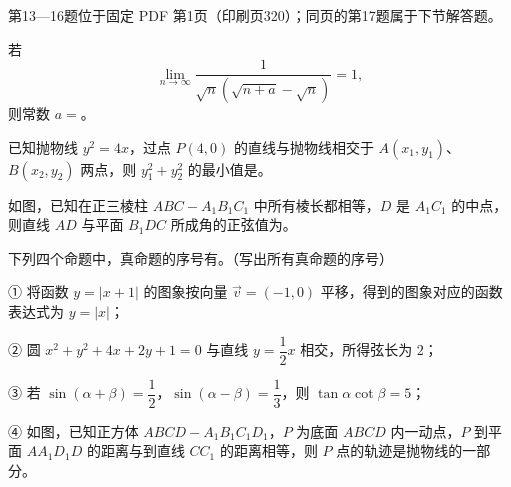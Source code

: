 \begin{gktip}
第13—16题位于固定 PDF 第1页（印刷页320）；同页的第17题属于下节解答题。
\end{gktip}

\begin{question}
若
\nopagebreak[4]
\[
\lim_{n\to\infty}\frac{1}{\sqrt n\left(\sqrt{n+a}-\sqrt n\right)}=1,
\]
则常数 $a=$\gkblank{}。

\end{question}
\begin{question}
已知抛物线 $y^2=4x$，过点 $P(4,0)$ 的直线与抛物线相交于 $A(x_1,y_1)$、$B(x_2,y_2)$ 两点，则 $y_1^2+y_2^2$ 的最小值是\gkblank{}。

\Needspace{0.4\textheight}
\end{question}
\begin{question}
如图，已知在正三棱柱 $ABC-A_1B_1C_1$ 中所有棱长都相等，$D$ 是 $A_1C_1$ 的中点，则直线 $AD$ 与平面 $B_1DC$ 所成角的正弦值为\gkblank{}。
\nopagebreak[4]
\begin{center}\end{center}
\nopagebreak[4]
\Needspace{0.4\textheight}
\end{question}
\begin{question}
下列四个命题中，真命题的序号有\gkblank{}。（写出所有真命题的序号）

① 将函数 $y=|x+1|$ 的图象按向量 $\vec v=(-1,0)$ 平移，得到的图象对应的函数表达式为 $y=|x|$；

② 圆 $x^2+y^2+4x+2y+1=0$ 与直线 $y=\dfrac12x$ 相交，所得弦长为 $2$；

③ 若 $\sin(\alpha+\beta)=\dfrac12$，$\sin(\alpha-\beta)=\dfrac13$，则 $\tan\alpha\cot\beta=5$；

④ 如图，已知正方体 $ABCD-A_1B_1C_1D_1$，$P$ 为底面 $ABCD$ 内一动点，$P$ 到平面 $AA_1D_1D$ 的距离与到直线 $CC_1$ 的距离相等，则 $P$ 点的轨迹是抛物线的一部分。
\nopagebreak[4]
\begin{center}\end{center}
\nopagebreak[4]
\end{question}

